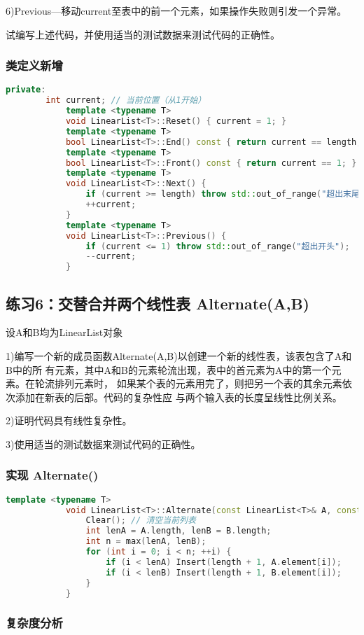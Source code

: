 \documentclass[UTF8]{ctexart}
\begin{document}
	6)Previous—移动current至表中的前一个元素，如果操作失败则引发一个异常。
	
	试编写上述代码，并使用适当的测试数据来测试代码的正确性。
	\subsubsection{类定义新增}
	
	\begin{lstlisting}[language=C++]
		private:
		int current; // 当前位置（从1开始）
			template <typename T>
			void LinearList<T>::Reset() { current = 1; }
			template <typename T>
			bool LinearList<T>::End() const { return current == length; }
			template <typename T>
			bool LinearList<T>::Front() const { return current == 1; }
			template <typename T>
			void LinearList<T>::Next() {
				if (current >= length) throw std::out_of_range("超出末尾");
				++current;
			}
			template <typename T>
			void LinearList<T>::Previous() {
				if (current <= 1) throw std::out_of_range("超出开头");
				--current;
			}
		\end{lstlisting}
		\subsection{练习6：交替合并两个线性表 Alternate(A,B)}
		设A和B均为LinearList对象
		
		1)编写一个新的成员函数Alternate(A,B)以创建一个新的线性表，该表包含了A和B中的所
		有元素，其中A和B的元素轮流出现，表中的首元素为A中的第一个元素。在轮流排列元素时，
		如果某个表的元素用完了，则把另一个表的其余元素依次添加在新表的后部。代码的复杂性应
		与两个输入表的长度呈线性比例关系。
		
		2)证明代码具有线性复杂性。
		
		3)使用适当的测试数据来测试代码的正确性。
		\subsubsection{实现 Alternate()}
		
		\begin{lstlisting}[language=C++]
			template <typename T>
			void LinearList<T>::Alternate(const LinearList<T>& A, const LinearList<T>& B) {
				Clear(); // 清空当前列表
				int lenA = A.length, lenB = B.length;
				int n = max(lenA, lenB);
				for (int i = 0; i < n; ++i) {
					if (i < lenA) Insert(length + 1, A.element[i]);
					if (i < lenB) Insert(length + 1, B.element[i]);
				}
			}
		\end{lstlisting}
		\subsubsection{复杂度分析}
		
\end{document}
